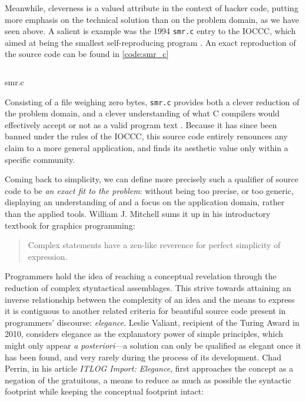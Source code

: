 Meanwhile, cleverness is a valued attribute in the context of hacker code, putting more emphasis on the technical solution than on the problem domain, as we have seen above. A salient is example was the 1994 \lstinline{smr.c} entry to the IOCCC, which aimed at being the smallest self-reproducing program \citep{kanakarakis_international_2022}. An exact reproduction of the source code can be found in \ref{code:smr_c}

\begin{listing}
\inputminted{c}{./corpus/smr.c}
  \caption{smr.c}
  \label{code:smr_c}
\end{listing}

Consisting of a file weighing zero bytes, \lstinline{smr.c} provides both a clever reduction of the problem domain, and a clever understanding of what C compilers would effectively accept or not as a valid program text \citep{kanakarakis_international_2022a}. Because it has since been banned under the rules of the IOCCC, this source code entirely renounces any claim to a more general application, and finds its aesthetic value only within a specific community.

Coming back to simplicity, we can define more precisely such a qualifier of source code to be \emph{an exact fit to the problem}: without being too precise, or too generic, displaying an understanding of and a focus on the application domain, rather than the applied tools. William J. Mitchell sums it up in his introductory textbook for graphics programming:

\begin{quote}
  Complex statements have a zen-like reverence for perfect simplicity of expression. \citep{mitchell_art_1987}
\end{quote}

Programmers hold the idea of reaching a conceptual revelation through the reduction of complex styntactical assemblages. This strive towards attaining an inverse relationship between the complexity of an idea and the means to express it is contiguous to another related criteria for beautiful source code present in programmers' discourse: \emph{elegance}. Leslie Valiant, recipient of the Turing Award in 2010, considers elegance as the explanatory power of simple principles, which might only appear \emph{a posteriori}—a solution can only be qualified as elegant once it has been found, and very rarely during the process of its development\citep{anthes_beauty_2011}. Chad Perrin, in his article \emph{ITLOG Import: Elegance}, first approaches the concept as a negation of the gratuitous, a means to reduce as much as possible the syntactic footprint while keeping the conceptual footprint intact:

